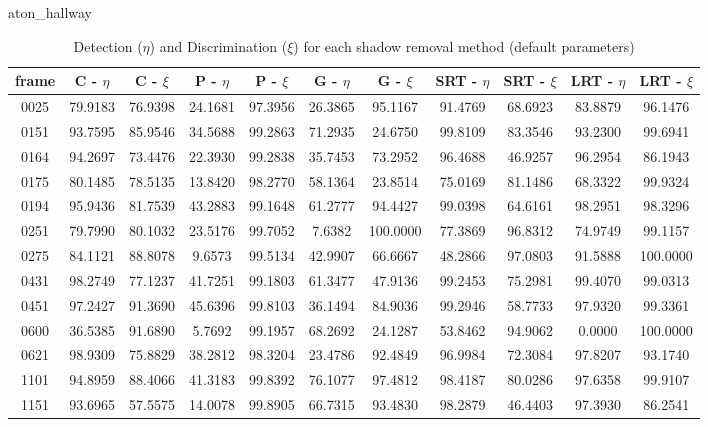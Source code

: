 \begin{appendices}
\begin{table}
\end{table}

\begin{table}
\centering
\caption{aton\_hallway}
\caption*{Detection ($\eta$) and Discrimination ($\xi$) for each shadow removal method (default parameters)}
\begin{tabular}{ |c|c|c|c|c|c|c|c|c|c|c| }
	\hline
\textbf{frame} &  \textbf{C - $\eta$} &  \textbf{C - $\xi$} &  \textbf{P - $\eta$} &  \textbf{P - $\xi$} &  \textbf{G - $\eta$} &  \textbf{G - $\xi$} &  \textbf{SRT - $\eta$} &  \textbf{SRT - $\xi$} &  \textbf{LRT - $\eta$} &  \textbf{LRT - $\xi$} \\
\hline
\hline
0025 &  79.9183 &  76.9398 &   24.1681 &  97.3956 &   26.3865 &  95.1167 &   91.4769 &  68.6923 &   83.8879 &  96.1476   \\
\hline
0151 &  93.7595 &  85.9546 &   34.5688 &  99.2863 &   71.2935 &  24.6750 &   99.8109 &  83.3546 &   93.2300 &  99.6941    \\
\hline
0164 &  94.2697 &  73.4476 &   22.3930 &  99.2838 &   35.7453 &  73.2952 &   96.4688 &  46.9257 &   96.2954 &  86.1943    \\
\hline
0175 &  80.1485 &  78.5135 &   13.8420 &  98.2770 &   58.1364 &  23.8514 &   75.0169 &  81.1486 &   68.3322 &  99.9324    \\
\hline
0194 &  95.9436 &  81.7539 &   43.2883 &  99.1648 &   61.2777 &  94.4427 &   99.0398 &  64.6161 &   98.2951 &  98.3296    \\
\hline
0251 &  79.7990 &  80.1032 &   23.5176 &  99.7052 &   7.6382 &  100.0000 &   77.3869 &  96.8312 &   74.9749 &  99.1157    \\
\hline
0275 &  84.1121 &  88.8078 &   9.6573 &  99.5134 &   42.9907 &  66.6667 &   48.2866 &  97.0803 &   91.5888 &  100.0000    \\
\hline
0431 &  98.2749 &  77.1237 &   41.7251 &  99.1803 &   61.3477 &  47.9136 &   99.2453 &  75.2981 &   99.4070 &  99.0313    \\
\hline
0451 &  97.2427 &  91.3690 &   45.6396 &  99.8103 &   36.1494 &  84.9036 &   99.2946 &  58.7733 &   97.9320 &  99.3361    \\
\hline
0600 &  36.5385 &  91.6890 &   5.7692 &  99.1957 &   68.2692 &  24.1287 &   53.8462 &  94.9062 &   0.0000 &  100.0000    \\
\hline
0621 &  98.9309 &  75.8829 &   38.2812 &  98.3204 &   23.4786 &  92.4849 &   96.9984 &  72.3084 &   97.8207 &  93.1740    \\
\hline
1101 &  94.8959 &  88.4066 &   41.3183 &  99.8392 &   76.1077 &  97.4812 &   98.4187 &  80.0286 &   97.6358 &  99.9107    \\
\hline
1151 &  93.6965 &  57.5575 &   14.0078 &  99.8905 &   66.7315 &  93.4830 &   98.2879 &  46.4403 &   97.3930 &  86.2541   \\


\end{tabular}
\end{table}
\end{appendices}

